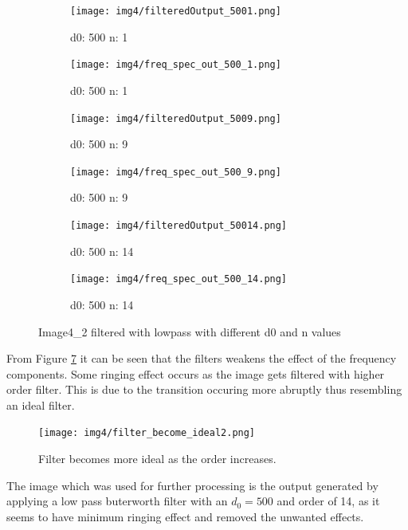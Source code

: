 \begin{figure}[H]
    
      \begin{subfigure}[b]{0.16\textwidth}
        \texttt{[image: img4/filteredOutput\_5001.png]}
        \caption{d0: 500 n: 1}
        \label{fig:img4_5001_im}
    \end{subfigure}
    \begin{subfigure}[b]{0.1555\textwidth}
        \texttt{[image: img4/freq\_spec\_out\_500\_1.png]}
        \caption{d0: 500 n: 1}
        \label{fig:img4_5001_fr}
    \end{subfigure}
	 \begin{subfigure}[b]{0.16\textwidth}
        \texttt{[image: img4/filteredOutput\_5009.png]}
        \caption{d0: 500 n: 9}
        \label{fig:img4_5009_im}
    \end{subfigure}
    \begin{subfigure}[b]{0.1555\textwidth}
        \texttt{[image: img4/freq\_spec\_out\_500\_9.png]}
        \caption{d0: 500 n: 9}
        \label{fig:img4_5009_fr}
    \end{subfigure}	
\begin{subfigure}[b]{0.16\textwidth}
        \texttt{[image: img4/filteredOutput\_50014.png]}
        \caption{d0: 500 n: 14}
        \label{fig:img4_50014_im}
    \end{subfigure}
    \begin{subfigure}[b]{0.1555\textwidth}
        \texttt{[image: img4/freq\_spec\_out\_500\_14.png]}
        \caption{d0: 500 n: 14}
        \label{fig:img4_50014_fr}
    \end{subfigure}
 	\caption{Image4\_2 filtered with lowpass with different d0 and n values}
 	\label{fig:lowpass_all}
\end{figure}

From Figure \ref{fig:lowpass_all} it can be seen that the filters weakens the effect of the frequency components. Some ringing effect occurs as the image gets filtered with higher order filter. This is due to the transition occuring more abruptly thus resembling an ideal filter. 

\begin{figure}[H]
	\centering
	\texttt{[image: img4/filter\_become\_ideal2.png]}
	\caption{Filter becomes more ideal as the order increases.}
    \label{fig:filter_become_ideal}
\end{figure}


The image which was used for further processing is the output generated by applying a low pass buterworth filter with an $d_0 = 500$ and order of 14, as it seems to have minimum ringing effect and removed the unwanted effects. \\
 
